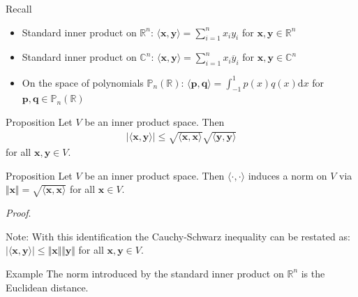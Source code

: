 \documentclass [aspectratio=169]{beamer}
\newcommand{\bx}{{\mathbf{x}}}
\newcommand{\by}{{\mathbf{y}}}
\newcommand{\innerprod}[1]{\langle #1 \rangle}
\newcommand{\R}{{\mathbb{R}}}
\newcommand{\C}{{\mathbb{C}}}
\begin{document}
\begin{frame}{Recall}
\begin{example}
\begin{itemize}
      \setlength\itemsep{1.5em}
    \item Standard inner product on $\R^n$: $\innerprod{\bx,\by }= \sum_{i=1}^n x_iy_i$ for $\bx,\by\in \R^n$
    \item Standard inner product on $\C^n$: $\innerprod{\bx,\by }= \sum_{i=1}^n x_i\overline{y}_i$ for $\bx,\by\in \C^n$
    \item On the space of polynomials $\mathbb{P}_n(\R)$: $\innerprod{\boldsymbol{p},\boldsymbol{q}} = \int_{-1}^1 p(x) {q}(x) \mathrm{d}x$ for $\boldsymbol{p},\boldsymbol{q}\in \mathbb{P}_n(\R)$
\end{itemize}
\end{example}

\begin{exampleblock}{Proposition}
Let $V$ be an inner product space. Then 
\begin{align*}
    \vert \innerprod{\bx,\by}\vert \leq \sqrt{\innerprod{\bx,\bx}}\sqrt{\innerprod{\by,\by}}
\end{align*}
for all $\bx,\by\in V$.
\end{exampleblock}
\end{frame}


\begin{frame}
\begin{exampleblock}{Proposition}
Let $V$ be an inner product space. Then $\innerprod{\cdot,\cdot}$ induces a norm on $V$ via $\Vert \bx\Vert =\sqrt{\innerprod{\bx,\bx}} $ for all $\bx \in V$.
\end{exampleblock}
\textit{Proof}.
\vspace{4cm}
\end{frame}

\begin{frame}

\end{frame}

\begin{frame}
Note:
With this identification the Cauchy-Schwarz inequality can be restated as: $ \vert \innerprod{\bx,\by}\vert \leq \Vert \bx \Vert \Vert \by \Vert$ for all $\bx, \by\in V$.

\vspace{2em}

\begin{exampleblock}{Example}
The norm introduced by the standard inner product on $\R^n$ is the Euclidean distance. 
\end{exampleblock}
\end{frame}
\end{document}
